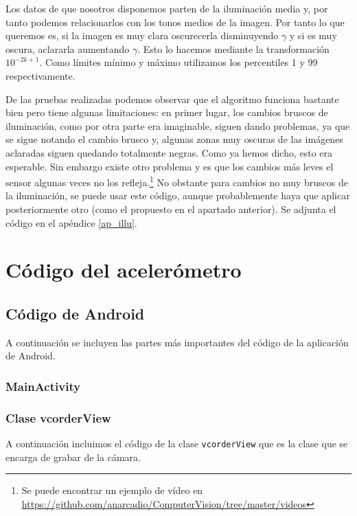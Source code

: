 \documentclass[a4paper,openright, 12pt]{book}
\begin{document}
Los datos de que nosotros disponemos parten de la iluminación media y, por tanto podemos relacionarlos con los tonos medios de la imagen. Por tanto lo que queremos es, si la imagen es muy clara oscurecerla disminuyendo $\gamma$ y si es muy oscura, aclararla aumentando $\gamma$.
Esto lo hacemos mediante la transformación $10^{-2k+1}$.
Como límites mínimo y máximo utilizamos los percentiles 1 y 99 respectivamente.

De las pruebas realizadas podemos observar que el algoritmo funciona bastante bien pero tiene algunas limitaciones: en primer lugar, los cambios bruscos de iluminación, como por otra parte era imaginable, siguen dando problemas, ya que se sigue notando el cambio brusco y, algunas zonas muy oscuras de las imágenes aclaradas siguen quedando totalmente negras. Como ya hemos dicho, esto era esperable. Sin embargo existe otro problema y es que los cambios más leves el sensor algunas veces no los refleja.\footnote{Se puede encontrar un ejemplo de vídeo en \url{https://github.com/anarcadio/ComputerVision/tree/master/videos}}
No obstante para cambios no muy bruscos de la iluminación, se puede usar este código, aunque probablemente haya que aplicar posteriormente otro (como el propuesto en el apartado anterior).
Se adjunta el código en el apéndice \ref{ap_illu}.
\appendix
\chapter{Código del acelerómetro} 
\section{Código de Android} \label{android_ap_acc}
A continuación se incluyen las partes más importantes del código de la aplicación de Android.

\subsection{MainActivity}


\newpage

\subsection{Clase vcorderView}
A continuación incluimos el código de la clase \lstinline|vcorderView| que es la clase que se encarga de grabar de la cámara.

\newpage
\end{document}
